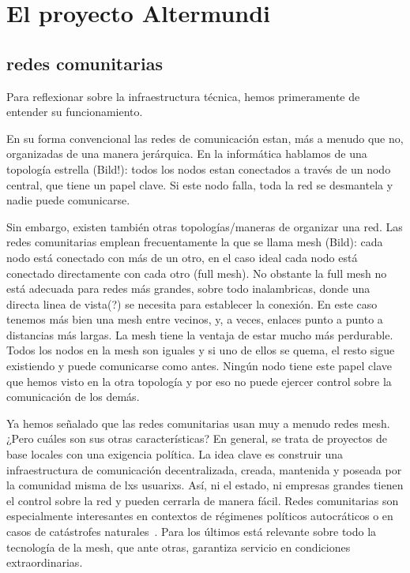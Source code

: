 \section{El proyecto Altermundi}

\subsection{redes comunitarias}

Para reflexionar sobre la infraestructura técnica, hemos primeramente de entender su funcionamiento.

En su forma convencional las redes de comunicación estan, más a menudo que no, organizadas de una manera jerárquica.
En la informática hablamos de una topología estrella (Bild!): todos los nodos estan conectados a través de un nodo central,
que tiene un papel clave.
Si este nodo falla, toda la red se desmantela y nadie puede comunicarse.

Sin embargo, existen también otras topologías/maneras de organizar una red.
Las redes comunitarias emplean frecuentamente la que se llama mesh (Bild):
cada nodo está conectado con más de un otro, en el caso ideal cada nodo está conectado directamente con cada otro (full mesh).
No obstante la full mesh no está adecuada para redes más grandes, sobre todo inalambricas, donde una directa linea de vista(?) se necesita para establecer la conexión.
En este caso tenemos más bien una mesh entre vecinos, y, a veces, enlaces punto a punto a distancias más largas.
La mesh tiene la ventaja de estar mucho más perdurable.
Todos los nodos en la mesh son iguales y si uno de ellos se quema, el resto sigue existiendo y puede comunicarse como antes.
Ningún nodo tiene este papel clave que hemos visto en la otra topología y por eso no puede ejercer control sobre la comunicación de los demás.

Ya hemos señalado que las redes comunitarias usan muy a menudo redes mesh.
¿Pero cuáles son sus otras características?
En general, se trata de proyectos de base locales con una exigencia política.
La idea clave es construir una infraestructura de comunicación decentralizada, creada, mantenida y poseada por la comunidad misma de lxs usuarixs.
Así, ni el estado, ni empresas grandes tienen el control sobre la red y pueden cerrarla de manera fácil.
Redes comunitarias son especialmente interesantes en contextos de régimenes políticos autocráticos o en casos de catástrofes naturales~\autocite{Mabb2014}.
Para los últimos está relevante sobre todo la tecnología de la mesh, que ante otras, garantiza servicio en condiciones extraordinarias.

